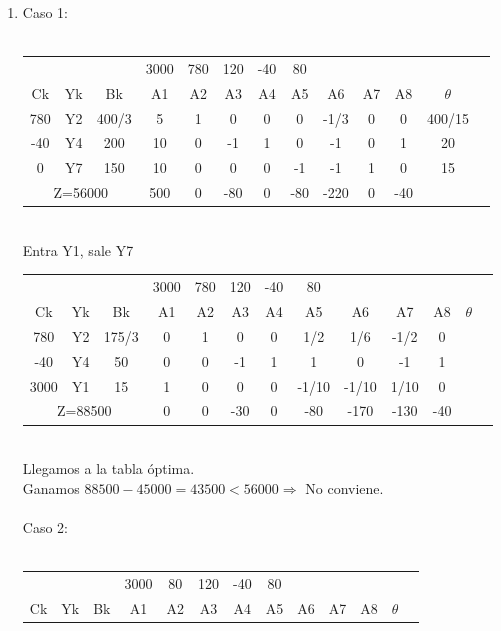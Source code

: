 \documentclass{article}
\begin{document}
\begin{enumerate}
	\item Caso 1:\\
     	\smallskip\\
		\begin{tabular}{|c  c  c | c  c  c  c  c  c  c  c  c | c |}
			\hline
			 \multicolumn{3}{|c|}{} & 3000 & 780 & 120 & -40 & 80 & & & & \\ 
			 Ck & Yk & Bk & A1 & A2 & A3 & A4 & A5 & A6 & A7 & A8 & $\theta$\\ \hline 
			 780 & Y2 & 400/3 & 5 & 1 & 0 & 0 & 0 & -1/3 & 0 & 0 & 400/15\\
			 -40 & Y4 & 200 & 10 & 0 & -1 & 1 & 0 & -1 & 0 & 1 & 20\\
			 0 & Y7 & 150 & 10 & 0 & 0 & 0 & -1 & -1 & 1 & 0 & 15\\ \hline
			 \multicolumn{3}{|c|}{Z=56000} & 500 & 0 & -80 & 0 & -80 & -220 & 0 & -40\\ \hline
		\end{tabular}
		\medskip\\
		Entra Y1, sale Y7\\
		\begin{tabular}{|c  c  c | c  c  c  c  c  c  c  c  c | c |}
			\hline
			 \multicolumn{3}{|c|}{} & 3000 & 780 & 120 & -40 & 80 & & & & \\ 
			 Ck & Yk & Bk & A1 & A2 & A3 & A4 & A5 & A6 & A7 & A8 & $\theta$\\ \hline 
			 780 & Y2 & 175/3 & 0 & 1 & 0 & 0 & 1/2 & 1/6 & -1/2 & 0 & \\
			 -40 & Y4 & 50 & 0 & 0 & -1 & 1 & 1 & 0 & -1 & 1 & \\
			 3000 & Y1 & 15 & 1 & 0 & 0 & 0 & -1/10 & -1/10 & 1/10 & 0 & \\ \hline
			 \multicolumn{3}{|c|}{Z=88500} & 0 & 0 & -30 & 0 & -80 & -170 & -130 & -40\\ \hline
		\end{tabular}
		\medskip\\
		Llegamos a la tabla \'optima.\\
		Ganamos $88500 - 45000 = 43500 < 56000 \Rightarrow $ No conviene.\\
		\smallskip\\
		Caso 2:\\
     	\smallskip\\
		\begin{tabular}{|c  c  c | c  c  c  c  c  c  c  c  c | c |}
			\hline
			 \multicolumn{3}{|c|}{} & 3000 & 80 & 120 & -40 & 80 & & & & \\ 
			 Ck & Yk & Bk & A1 & A2 & A3 & A4 & A5 & A6 & A7 & A8 & $\theta$\\ \hline 

\end{tabular}
\end{enumerate}
\end{document}
